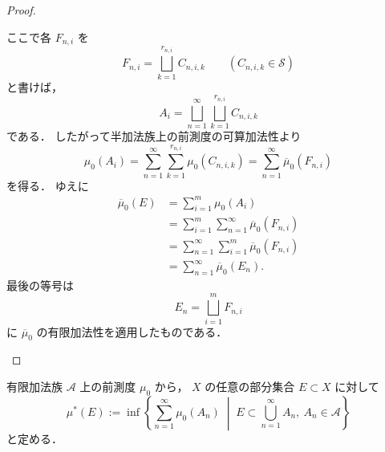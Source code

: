 \begin{proof}
\begin{enumerate}
    ここで各 $F_{n,i}$ を
    \[
    F_{n,i}=\bigsqcup_{k=1}^{r_{n,i}} C_{n,i,k}
    \qquad
    (C_{n,i,k}\in\mathcal S)
    \]
    と書けば，
    \[
    A_i
    =
    \bigsqcup_{n=1}^{\infty}\bigsqcup_{k=1}^{r_{n,i}} C_{n,i,k}
    \]
    である．
    したがって半加法族上の前測度の可算加法性より
    \[
    \mu_0(A_i)
    =
    \sum_{n=1}^{\infty}\sum_{k=1}^{r_{n,i}}\mu_0(C_{n,i,k})
    =
    \sum_{n=1}^{\infty}\overline{\mu}_0(F_{n,i})
    \]
    を得る．
    ゆえに
    \begin{align*}
    \overline{\mu}_0(E)
    &=
    \sum_{i=1}^m \mu_0(A_i) \\
    &=
    \sum_{i=1}^m \sum_{n=1}^{\infty}\overline{\mu}_0(F_{n,i}) \\
    &=
    \sum_{n=1}^{\infty}\sum_{i=1}^m \overline{\mu}_0(F_{n,i}) \\
    &=
    \sum_{n=1}^{\infty}\overline{\mu}_0(E_n).
    \end{align*}
    最後の等号は
    \[
    E_n=\bigsqcup_{i=1}^m F_{n,i}
    \]
    に $\overline{\mu}_0$ の有限加法性を適用したものである．
\end{enumerate}
\end{proof}

\begin{definition}[外測度の生成]
有限加法族 $\mathcal A$ 上の前測度 $\mu_0$ から，
$X$ の任意の部分集合 $E \subset X$ に対して
\[
\mu^*(E)
:=
\inf\left\{
\sum_{n=1}^{\infty}\mu_0(A_n)
\;\middle|\;
E \subset \bigcup_{n=1}^{\infty}A_n,\ 
A_n \in \mathcal A
\right\}
\]
と定める．
\end{definition}


